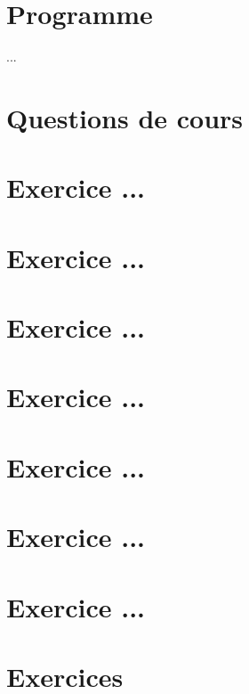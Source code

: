 \documentclass[12pt,french]{report}
\begin{document}
\begin{spacing}{1.2}
\section{Programme}

...

\section{Questions de cours}

\section*{Exercice ...}


\section*{Exercice ...}


\section*{Exercice ...}


\section*{Exercice ...}


\section*{Exercice ...}


\section*{Exercice ...}


\section*{Exercice ...}




\section{Exercices}
\label{exo1}
\begin{Exercice}[]%






\end{Exercice}
\end{spacing}
\end{document}
